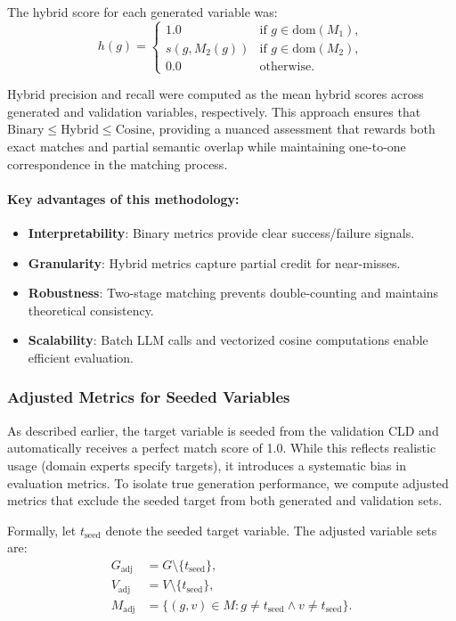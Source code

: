 The hybrid score for each generated variable was:
\[
h(g) = \begin{cases}
1.0 & \text{if } g \in \text{dom}(M_1), \\
s(g, M_2(g)) & \text{if } g \in \text{dom}(M_2), \\
0.0 & \text{otherwise}.
\end{cases}
\]

Hybrid precision and recall were computed as the mean hybrid scores across generated and validation variables, respectively. This approach ensures that \(\text{Binary} \leq \text{Hybrid} \leq \text{Cosine}\), providing a nuanced assessment that rewards both exact matches and partial semantic overlap while maintaining one-to-one correspondence in the matching process.

\paragraph{Key advantages of this methodology:}
\begin{itemize}
\item \textbf{Interpretability}: Binary metrics provide clear success/failure signals.
\item \textbf{Granularity}: Hybrid metrics capture partial credit for near-misses.
\item \textbf{Robustness}: Two-stage matching prevents double-counting and maintains theoretical consistency.
\item \textbf{Scalability}: Batch LLM calls and vectorized cosine computations enable efficient evaluation.
\end{itemize}
\subsubsection{Adjusted Metrics for Seeded Variables}
\label{sec:adjusted_metrics}

As described earlier, the target variable is seeded from the validation CLD and automatically receives a perfect match score of 1.0. While this reflects realistic usage (domain experts specify targets), it introduces a systematic bias in evaluation metrics. To isolate true generation performance, we compute adjusted metrics that exclude the seeded target from both generated and validation sets.

Formally, let \(t_{\text{seed}}\) denote the seeded target variable. The adjusted variable sets are:
\begin{align*}
G_{\text{adj}} &= G \setminus \{t_{\text{seed}}\}, \\
V_{\text{adj}} &= V \setminus \{t_{\text{seed}}\}, \\
M_{\text{adj}} &= \{(g, v) \in M : g \neq t_{\text{seed}} \land v \neq t_{\text{seed}}\}.
\end{align*}

